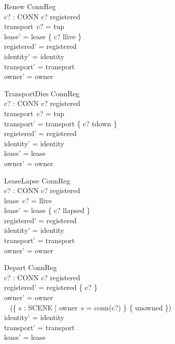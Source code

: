\documentclass[a4paper,10pt,fleqn]{article}
\begin{document}
\begin{schema}{Renew}
  \Delta ConnReg \\
  c? : CONN
\where
  c? \in registered \\
  transport~c? = tup \\
  lease' = lease \oplus \{ c? \mapsto llive \} \\
  registered' = registered \\
  identity' = identity \\
  transport' = transport \\
  owner' = owner
\end{schema}

\begin{schema}{TransportDies}
  \Delta ConnReg \\
  c? : CONN
\where
  c? \in registered \\
  transport~c? = tup \\
  transport' = transport \oplus \{ c? \mapsto tdown \} \\
  registered' = registered \\
  identity' = identity \\
  lease' = lease \\
  owner' = owner
\end{schema}

\begin{schema}{LeaseLapse}
  \Delta ConnReg \\
  c? : CONN
\where
  c? \in registered \\
  lease~c? = llive \\
  lease' = lease \oplus \{ c? \mapsto llapsed \} \\
  registered' = registered \\
  identity' = identity \\
  transport' = transport \\
  owner' = owner
\end{schema}

\begin{schema}{Depart}
  \Delta ConnReg \\
  c? : CONN
\where
  c? \in registered \\
  registered' = registered \setminus \{ c? \} \\
  owner' = owner \oplus \\
  \quad~ (\{ s : SCENE | owner~s = conn(c?) \} \cross \{ unowned \}) \\
  identity' = identity \\
  transport' = transport \\
  lease' = lease
\end{schema}
\end{document}
